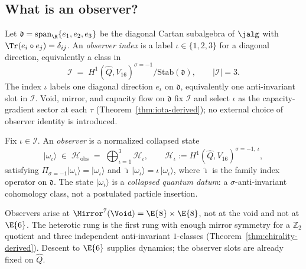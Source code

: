 \subsection{What is an observer?}
\label{sec:observer:definition}

\begin{definition}\label{def:observer-index}
Let $\mathfrak{d}=\mathrm{span}_\R\{e_1,e_2,e_3\}$ be the diagonal Cartan
subalgebra of $\jalg$ with $\Tr(e_i\circ e_j)=\delta_{ij}$.
An \emph{observer index} is a label $\iota\in\{1,2,3\}$ for a diagonal direction,
equivalently a class in
\begin{equation}\label{eq:observer-index}
  \mathcal{I} \;=\; H^1(\hat Q,V_{16})^{\sigma=-1}/\mathrm{Stab}(\mathfrak{d}),
  \qquad |\mathcal{I}|=3.
\end{equation}
The index $\iota$ labels one diagonal direction $e_\iota$ on $\mathfrak{d}$,
equivalently one anti-invariant slot in $\mathcal{I}$. Void, mirror, and
capacity flow on $\mathfrak{d}$ fix $\mathcal{I}$ and select $\iota$ as the
capacity-gradient sector at each $\tau$ (Theorem~\ref{thm:iota-derived}); no
external choice of observer identity is introduced.
\end{definition}

\begin{definition}\label{def:observer}
Fix $\iota\in\mathcal{I}$. An \emph{observer} is a normalized collapsed state
\begin{equation}\label{eq:observer-state}
  |\omega_\iota\rangle \;\in\; \mathcal{H}_{\mathrm{obs}}
  \;=\; \bigoplus_{\iota=1}^3 \mathcal{H}_\iota,
  \qquad
  \mathcal{H}_\iota := H^1(\hat Q,V_{16})^{\sigma=-1,\,\iota},
\end{equation}
satisfying $\Pi_{\sigma=-1}|\omega_\iota\rangle=|\omega_\iota\rangle$ and
$\hat{\imath}\,|\omega_\iota\rangle=\iota\,|\omega_\iota\rangle$, where
$\hat{\imath}$ is the family index operator on $\mathfrak{d}$.
The state $|\omega_\iota\rangle$ is a \emph{collapsed quantum datum}: a
$\sigma$-anti-invariant cohomology class, not a postulated particle insertion.
\end{definition}

\begin{remark}
Observers arise at $\Mirror^7(\Void)=\E{8}\times\E{8}$, not at the void and
not at $\E{6}$. The heterotic rung is the first rung with enough mirror
symmetry for a $\mathbb{Z}_2$ quotient and three independent anti-invariant
$1$-classes (Theorem~\ref{thm:chirality-derived}). Descent to $\E{6}$ supplies
dynamics; the observer slots are already fixed on $\hat Q$.
\end{remark}

